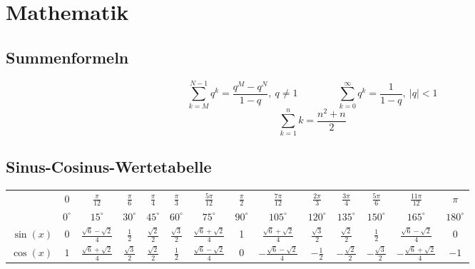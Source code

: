 \documentclass[10pt,a4paper]{article}
\begin{document}
\section*{Mathematik}
\subsection*{Summenformeln}
\[ \sum_{k = M}^{N - 1} q^k = \frac{q^M - q^N}{1 - q}, ~ q \neq 1  \qquad \qquad \sum_{k = 0}^{\infty} q^k = \frac{1}{1 - q}, ~ |q| < 1 \]
\[ \sum_{k = 1}^{n} k = \frac{n^2 + n}{2} \]

\subsection*{Sinus-Cosinus-Wertetabelle}
\begin{center}
	\renewcommand{\arraystretch}{1.6}
	\footnotesize

	\begin{tabular}{r|c|c|c|c|c|c|c|c|c|c|c|c|c}
		  & 0 & $\frac{\pi}{12}$ & $\frac{\pi}{6}$ & $\frac{\pi}{4}$ & $\frac{\pi}{3}$ & $\frac{5\pi}{12}$ & $\frac{\pi}{2}$ & $\frac{7\pi}{12}$ & $\frac{2\pi}{3}$ & $\frac{3\pi}{4}$ & $\frac{5\pi}{6}$ & $\frac{11\pi}{12}$ & $\pi$ \\ \cline{2-14}	&$0^\circ$&$15^\circ$&$30^\circ$&$45^\circ$&$60^\circ$&$75^\circ$&$90^\circ$&$105^\circ$&$120^\circ$&$135^\circ$&$150^\circ$&$165^\circ$&$180^\circ$\\\hline
		$\sin(x)$&$0$&$\frac{\sqrt{6}-\sqrt{2}}{4}$&$\frac{1}{2}$&$\frac{\sqrt{2}}{2}$&$\frac{\sqrt{3}}{2}$&$\frac{\sqrt{6}+\sqrt{2}}{4}$&1&$\frac{\sqrt{6}+\sqrt{2}}{4}$&$\frac{\sqrt{3}}{2}$&$\frac{\sqrt{2}}{2}$&$\frac{1}{2}$&$\frac{\sqrt{6}-\sqrt{2}}{4}$&$0$\\\hline
		$\cos(x)$&$1$&$\frac{\sqrt{6}+\sqrt{2}}{4}$&$\frac{\sqrt{3}}{2}$&$\frac{\sqrt{2}}{2}$&$\frac{1}{2}$&$\frac{\sqrt{6}-\sqrt{2}}{4}$&0&$-\frac{\sqrt{6}-\sqrt{2}}{4}$&$-\frac{1}{2}$&$-\frac{\sqrt{2}}{2}$&$-\frac{\sqrt{3}}{2}$&$-\frac{\sqrt{6}+\sqrt{2}}{4}$&$-1$\\\hline
	\end{tabular}

	\vspace{0.5em}


\end{center}
\end{document}
